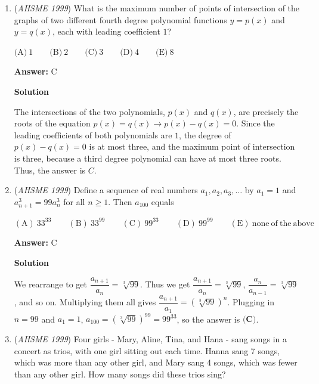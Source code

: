 \begin{enumerate}
 This gives a total cost of $0.18 + 3.60 + 54.00 + 80.00 = 137.78$.  There are $137.94 - 137.78 = 0.16$ dollars left over, which is enough for $8$ digits, or $2$ more four digit lockers.  These lockers are $2000$ and $2001$, leading to answer $\boxed{\textbf{(A)}}$.

 


	\item (\textit{AHSME 1999}) What is the maximum number of points of intersection of the graphs of two different fourth degree polynomial functions $y = p(x)$ and $y = q(x)$, each with leading coefficient $1$?


 $\textrm{(A)} \ 1 \qquad \textrm{(B)} \ 2 \qquad \textrm{(C)} \ 3 \qquad \textrm{(D)} \ 4 \qquad \textrm{(E)} \ 8$

 \textbf{Answer: }C



\textbf{Solution}

The intersections of the two polynomials, $p(x)$ and $q(x)$, are precisely the roots of the equation $p(x)=q(x) \rightarrow p(x) - q(x) = 0$. Since the leading coefficients of both polynomials are $1$, the degree of $p(x) - q(x) = 0$ is at most three, and the maximum point of intersection is three, because a third degree polynomial can have at most three roots. Thus, the answer is $\boxed{C}$.

 


	\item (\textit{AHSME 1999}) Define a sequence of real numbers $a_1, a_2, a_3, \ldots$ by $a_1 = 1$ and $a_{n+1}^3 = 99a_n^3$ for all $n \ge 1$. Then $a_{100}$ equals


 $\mathrm{(A) \ } 33^{33} \qquad \mathrm{(B) \ } 33^{99} \qquad \mathrm{(C) \ } 99^{33} \qquad \mathrm{(D) \ }99^{99} \qquad \mathrm{(E) \ none\ of\ the\ above}$

 \textbf{Answer: }C



\textbf{Solution}

We rearrange to get $\dfrac{a_{n+1}}{a_n} = \sqrt[3]{99}$. Thus we get $\dfrac{a_{n+1}}{a_n} = \sqrt[3]{99}$, $\dfrac{a_{n}}{a_{n-1}} = \sqrt[3]{99}$, and so on. Multiplying them all gives $\dfrac{a_{n+1}}{a_1} = (\sqrt[3]{99})^{n}$. Plugging in $n = 99$ and $a_1 = 1$, $a_{100} = (\sqrt[3]{99})^{99} = 99^{33}$, so the answer is $\textbf{(C)}$.

 


	\item (\textit{AHSME 1999}) Four girls - Mary, Aline, Tina, and Hana - sang songs in a concert as trios, with one girl sitting out each time. Hanna sang 7 songs, which was more than any other girl, and Mary sang 4 songs, which was fewer than any other girl. How many songs did these trios sing? 



\end{enumerate}
